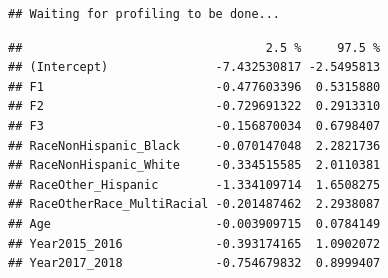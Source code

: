 \documentclass[
]{article}
\begin{document}
\begin{verbatim}
## Waiting for profiling to be done...
\end{verbatim}

\begin{verbatim}
##                                  2.5 %     97.5 %
## (Intercept)               -7.432530817 -2.5495813
## F1                        -0.477603396  0.5315880
## F2                        -0.729691322  0.2913310
## F3                        -0.156870034  0.6798407
## RaceNonHispanic_Black     -0.070147048  2.2821736
## RaceNonHispanic_White     -0.334515585  2.0110381
## RaceOther_Hispanic        -1.334109714  1.6508275
## RaceOtherRace_MultiRacial -0.201487462  2.2938087
## Age                       -0.003909715  0.0784149
## Year2015_2016             -0.393174165  1.0902072
## Year2017_2018             -0.754679832  0.8999407
\end{verbatim}
\end{document}
